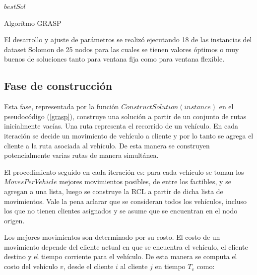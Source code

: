 \documentclass{article}
\begin{document}
  \begin{algorithm}
    \begin{algorithmic}
          \EndIf
            \EndIf
          \EndFor
          \EndIf
        \EndFor
        \State \Return $bestSol$
      \EndFunction
    \end{algorithmic}
    \caption{Algorítmo GRASP \label{grasp}}
  \end{algorithm}

  El desarrollo y ajuste de parámetros se realizó ejecutando 18 de las instancias del dataset Solomon de 25 nodos para las cuales se tienen valores óptimos o muy buenos de soluciones tanto para ventana fija como para ventana flexible.

  \subsection*{Fase de construcción}

  Esta fase, representada por la función $ConstructSolution(instance)$ en el pseudocódigo (\ref{grasp}), construye una solución a partir de un conjunto de rutas inicialmente vacías. Una ruta representa el recorrido de un vehículo. En cada iteración se decide un movimiento de vehículo a cliente y por lo tanto se agrega el cliente a la ruta asociada al vehículo. De esta manera se construyen potencialmente varias rutas de manera simultánea.

  El procedimiento seguido en cada iteración es: para cada vehículo se toman los $MovesPerVehicle$ mejores movimientos posibles, de entre los factibles, y se agregan a una lista, luego se construye la RCL a partir de dicha lista de movimientos. Vale la pena aclarar que se consideran todos los vehículos, incluso los que no tienen clientes asignados y se asume que se encuentran en el nodo origen.

  Los mejores movimientos son determinado por su costo. El costo de un movimiento depende del cliente actual en que se encuentra el vehículo, el cliente destino y el tiempo corriente para el vehículo. De esta manera se computa el costo del vehículo $v$, desde el cliente $i$ al cliente $j$ en tiempo $T_v$ como:
\end{document}
